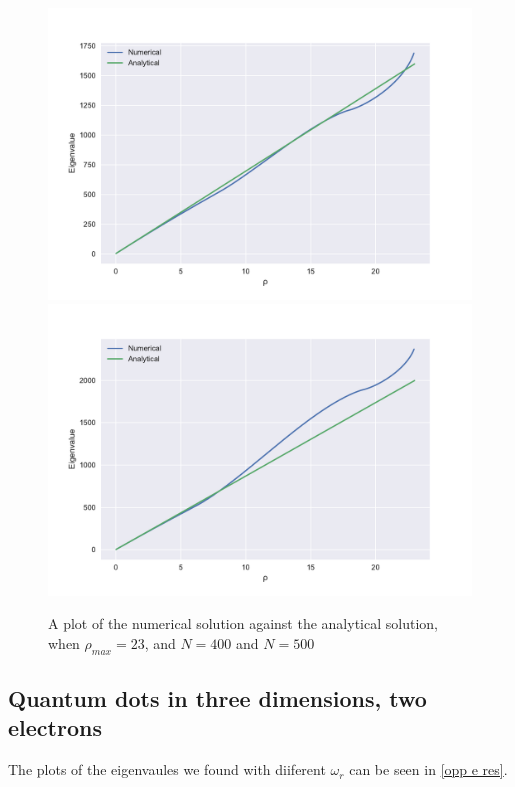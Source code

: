 \documentclass[a4paper]{article}
\begin{document}
\begin{figure}[h!]
	\centering 
	\includegraphics[scale=0.7]{../oppd_rho-23n-400.pdf}
	\includegraphics[scale=0.7]{../oppd_rho-23n-500.pdf}
	\caption{A plot of the numerical solution against the analytical solution, when $\rho_{max}=23$, and $N=400$ and $N=500$}
	\label{rhomaks 23}
\end{figure}
	

\subsection{Quantum dots in three dimensions, two electrons}
The plots of the eigenvaules we found with diiferent $\omega_r$ can be seen in \ref{opp e res}.
\end{document}
